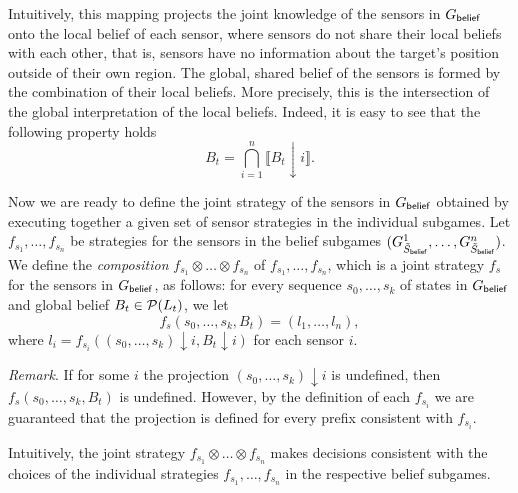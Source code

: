 Intuitively, this mapping projects the joint knowledge of the sensors in $G_{\mathsf{belief}}$ onto the local belief of each sensor, where sensors do not  share their local beliefs with each other, that is, sensors have no information about the target's position outside of their own region. The global, shared belief of the sensors is formed by the combination of their local beliefs. More precisely, this is the intersection of the  global interpretation of the local beliefs. Indeed, it is easy to see that the following property holds
\[B_t = \bigcap_{i=1}^n \llbracket B_t{\downarrow}i\rrbracket.\]

Now we are ready to define the joint strategy of the sensors in $G_{\mathsf{belief}}$ obtained by executing together a given set of sensor strategies in the individual subgames. 
Let $f_{s_1},\ldots,f_{s_n}$ be strategies for the sensors in the belief subgames $(G^{1}_{\tilde{S}_{\mathsf{belief}}},\ldots,G^{n}_{\tilde{S}_{\mathsf{belief}}})$. We define the \emph{composition} $f_{s_1} \otimes\ldots\otimes f_{s_n}$ of $f_{s_1},\ldots,f_{s_n}$, which is a joint strategy $f_s$ for the sensors in $G_{\mathsf{belief}}$, as follows:
for every sequence $s_0,\ldots,s_k$ of states in $G_{\mathsf{belief}}$ and global belief $B_t \in \mathcal{P}(L_t)$, we let
\[f_s(s_0,\ldots,s_k,B_t) = (l_1,\ldots,l_n),\]
where $l_i = f_{s_i}((s_0,\ldots,s_k){\downarrow}i,B_t{\downarrow}i)$ for each sensor $i$. 

\emph{Remark}. If for some $i$ the projection $(s_0,\ldots,s_k){\downarrow}i$ is undefined, then $f_s(s_0,\ldots,s_k,B_t)$ is undefined. However, by the definition of each $f_{s_i}$ we are guaranteed that the projection is defined for every prefix consistent with $f_{s_i}$.

Intuitively, the joint strategy $f_{s_1} \otimes\ldots\otimes f_{s_n}$ makes decisions consistent with the choices of the individual strategies $f_{s_1}, \ldots, f_{s_n}$ in the respective belief subgames.

